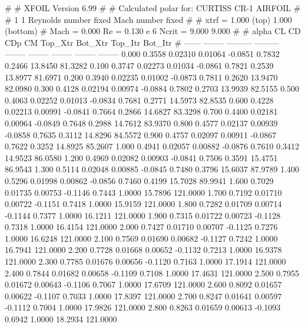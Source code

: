 #  
#       XFOIL         Version 6.99
#  
# Calculated polar for: CURTISS CR-1 AIRFOIL                            
#  
# 1 1 Reynolds number fixed          Mach number fixed         
#  
# xtrf =   1.000 (top)        1.000 (bottom)  
# Mach =   0.000     Re =     0.130 e 6     Ncrit =   9.000  9.000
#  
#   alpha    CL        CD       CDp       CM     Top_Xtr  Bot_Xtr  Top_Itr  Bot_Itr
#  ------ -------- --------- --------- -------- -------- -------- -------- --------
   0.000   0.3558   0.02310   0.01064  -0.0851   0.7832   0.2466  13.8450  81.3282
   0.100   0.3747   0.02273   0.01034  -0.0861   0.7821   0.2539  13.8977  81.6971
   0.200   0.3940   0.02235   0.01002  -0.0873   0.7811   0.2620  13.9470  82.0980
   0.300   0.4128   0.02194   0.00974  -0.0884   0.7802   0.2703  13.9939  82.5155
   0.500   0.4063   0.02252   0.01013  -0.0834   0.7681   0.2771  14.5973  82.8535
   0.600   0.4228   0.02213   0.00991  -0.0841   0.7664   0.2866  14.6827  83.3298
   0.700   0.4400   0.02181   0.00964  -0.0849   0.7648   0.2988  14.7612  83.9370
   0.800   0.4577   0.02137   0.00939  -0.0858   0.7635   0.3112  14.8296  84.5572
   0.900   0.4757   0.02097   0.00911  -0.0867   0.7622   0.3252  14.8925  85.2607
   1.000   0.4941   0.02057   0.00882  -0.0876   0.7610   0.3412  14.9523  86.0580
   1.200   0.4969   0.02082   0.00903  -0.0841   0.7506   0.3591  15.4751  86.9543
   1.300   0.5114   0.02048   0.00885  -0.0845   0.7480   0.3796  15.6037  87.9789
   1.400   0.5296   0.01998   0.00862  -0.0856   0.7460   0.4199  15.7028  89.9941
   1.600   0.7029   0.01735   0.00753  -0.1146   0.7443   1.0000  15.7896 121.0000
   1.700   0.7192   0.01710   0.00722  -0.1151   0.7418   1.0000  15.9159 121.0000
   1.800   0.7282   0.01709   0.00714  -0.1144   0.7377   1.0000  16.1211 121.0000
   1.900   0.7315   0.01722   0.00723  -0.1128   0.7318   1.0000  16.4154 121.0000
   2.000   0.7427   0.01710   0.00707  -0.1125   0.7276   1.0000  16.6248 121.0000
   2.100   0.7569   0.01690   0.00682  -0.1127   0.7242   1.0000  16.7941 121.0000
   2.200   0.7728   0.01668   0.00652  -0.1132   0.7213   1.0000  16.9378 121.0000
   2.300   0.7785   0.01676   0.00656  -0.1120   0.7163   1.0000  17.1914 121.0000
   2.400   0.7844   0.01682   0.00658  -0.1109   0.7108   1.0000  17.4631 121.0000
   2.500   0.7955   0.01672   0.00643  -0.1106   0.7067   1.0000  17.6709 121.0000
   2.600   0.8092   0.01657   0.00622  -0.1107   0.7033   1.0000  17.8397 121.0000
   2.700   0.8247   0.01641   0.00597  -0.1112   0.7004   1.0000  17.9826 121.0000
   2.800   0.8263   0.01659   0.00613  -0.1093   0.6942   1.0000  18.2934 121.0000
